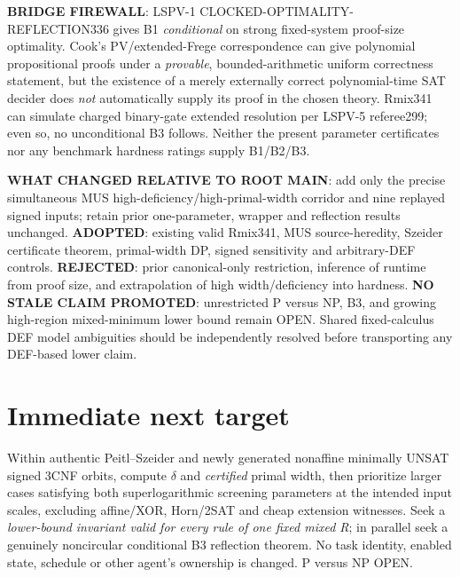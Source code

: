 \documentclass[11pt]{article}
\begin{document}
\textbf{BRIDGE FIREWALL}: LSPV-1 CLOCKED-OPTIMALITY-REFLECTION336 gives B1 \emph{conditional} on strong fixed-system proof-size optimality. Cook's PV/extended-Frege correspondence can give polynomial propositional proofs under a \emph{provable}, bounded-arithmetic uniform correctness statement, but the existence of a merely externally correct polynomial-time SAT decider does \emph{not} automatically supply its proof in the chosen theory. Rmix341 can simulate charged binary-gate extended resolution per LSPV-5 referee299; even so, no unconditional B3 follows. Neither the present parameter certificates nor any benchmark hardness ratings supply B1/B2/B3.

\textbf{WHAT CHANGED RELATIVE TO ROOT MAIN}: add only the precise simultaneous MUS high-deficiency/high-primal-width corridor and nine replayed signed inputs; retain prior one-parameter, wrapper and reflection results unchanged. \textbf{ADOPTED}: existing valid Rmix341, MUS source-heredity, Szeider certificate theorem, primal-width DP, signed sensitivity and arbitrary-DEF controls. \textbf{REJECTED}: prior canonical-only restriction, inference of runtime from proof size, and extrapolation of high width/deficiency into hardness. \textbf{NO STALE CLAIM PROMOTED}: unrestricted P versus NP, B3, and growing high-region mixed-minimum lower bound remain OPEN. Shared fixed-calculus DEF model ambiguities should be independently resolved before transporting any DEF-based lower claim.

\section*{Immediate next target}
Within authentic Peitl--Szeider and newly generated nonaffine minimally UNSAT signed 3CNF orbits, compute $\delta$ and \emph{certified} primal width, then prioritize larger cases satisfying both superlogarithmic screening parameters at the intended input scales, excluding affine/XOR, Horn/2SAT and cheap extension witnesses. Seek a \emph{lower-bound invariant valid for every rule of one fixed mixed R}; in parallel seek a genuinely noncircular conditional B3 reflection theorem. No task identity, enabled state, schedule or other agent's ownership is changed. P versus NP OPEN.



\end{document}

